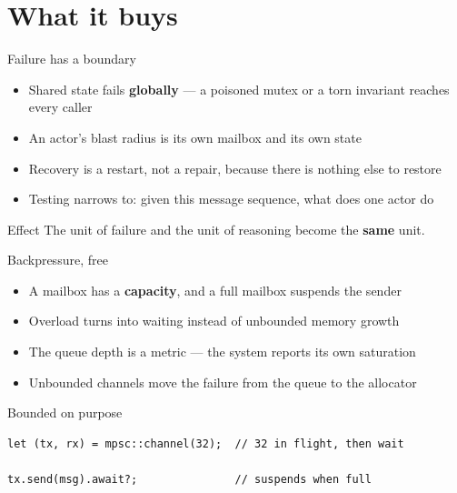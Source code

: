 \section{What it buys}

\begin{frame}{Failure has a boundary}
  \begin{itemize}
    \item Shared state fails \textbf{globally} --- a poisoned mutex or a torn invariant reaches every caller
    \item An actor's blast radius is its own mailbox and its own state
    \item Recovery is a restart, not a repair, because there is nothing else to restore
    \item Testing narrows to: given this message sequence, what does one actor do
  \end{itemize}
  \vspace{0.2cm}
  \begin{exampleblock}{Effect}
    The unit of failure and the unit of reasoning become the \textbf{same} unit.
  \end{exampleblock}
\end{frame}

\begin{frame}[fragile]{Backpressure, free}
  \begin{itemize}
    \item A mailbox has a \textbf{capacity}, and a full mailbox suspends the sender
    \item Overload turns into waiting instead of unbounded memory growth
    \item The queue depth is a metric --- the system reports its own saturation
    \item Unbounded channels move the failure from the queue to the allocator
  \end{itemize}
  \begin{block}{Bounded on purpose}
\begin{lstlisting}
let (tx, rx) = mpsc::channel(32);  // 32 in flight, then wait

tx.send(msg).await?;               // suspends when full
\end{lstlisting}
  \end{block}
\end{frame}

